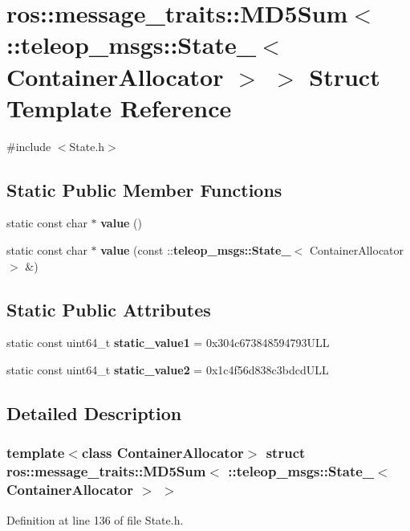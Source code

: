 \section{ros::message\_\-traits::MD5Sum$<$ ::teleop\_\-msgs::State\_\-$<$ ContainerAllocator $>$ $>$ Struct Template Reference}
\label{structros_1_1message__traits_1_1MD5Sum_3_01_1_1teleop__msgs_1_1State___3_01ContainerAllocator_01_4_01_4}


{\ttfamily \#include $<$State.h$>$}

\subsection*{Static Public Member Functions}
\begin{DoxyCompactItemize}
\item 
static const char $\ast$ {\bf value} ()
\item 
static const char $\ast$ {\bf value} (const ::{\bf teleop\_\-msgs::State\_\-}$<$ ContainerAllocator $>$ \&)
\end{DoxyCompactItemize}
\subsection*{Static Public Attributes}
\begin{DoxyCompactItemize}
\item 
static const uint64\_\-t {\bf static\_\-value1} = 0x304c673848594793ULL
\item 
static const uint64\_\-t {\bf static\_\-value2} = 0x1c4f56d838c3bdcdULL
\end{DoxyCompactItemize}


\subsection{Detailed Description}
\subsubsection*{template$<$class ContainerAllocator$>$ struct ros::message\_\-traits::MD5Sum$<$ ::teleop\_\-msgs::State\_\-$<$ ContainerAllocator $>$ $>$}



Definition at line 136 of file State.h.



